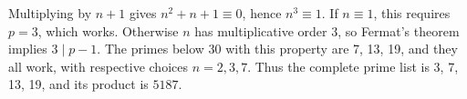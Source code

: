 Multiplying by $n+1$ gives $n^2+n+1\equiv0$, hence $n^3\equiv1$. If $n\equiv1$, this requires $p=3$, which works. Otherwise $n$ has multiplicative order 3, so Fermat's theorem implies $3\mid p-1$. The primes below 30 with this property are 7, 13, 19, and they all work, with respective choices $n=2,3,7$. Thus the complete prime list is 3, 7, 13, 19, and its product is $\boxed{5187}$.
